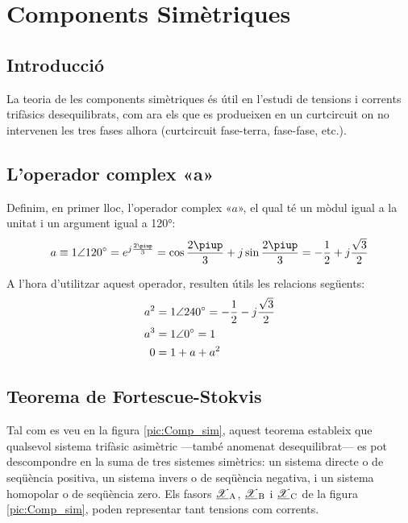 
\chapter{Components Simètriques}  \label{sec:ch-comp-sim}

\section{Introducció}
La teoria de les components simètriques és útil en l'estudi de
tensions i corrents trifàsics
 desequilibrats, com ara els que es produeixen en un curtcircuit on no intervenen les tres
 fases alhora (curtcircuit fase-terra, fase-fase, etc.).

\section{L'operador complex «a»}

Definim, en primer lloc, l'operador complex «$a$», el qual té un mòdul
igual a la unitat i un argument igual a \ang{120}: \begin{equation}
   a \equiv \complexnum{1:120} = e^{j\frac{2\piup}{3}} =
   \cos \frac{2\piup}{3} + j \sin \frac{2\piup}{3} = - \frac{1}{2} + j \frac{\sqrt{3}}{2}
\end{equation}

A l'hora d'utilitzar aquest operador, resulten útils les relacions
següents:
\begin{subequations}
\begin{align}
    a^2 &= \complexnum{1:240}= - \frac{1}{2} - j \frac{\sqrt{3}}{2} \\
    a^3 &= \complexnum{1:0} = 1 \\
    0 &= 1+ a + a^2
 \end{align}
\end{subequations}

\section{\texorpdfstring{Teorema de Fortescue-Stokvis}{Teorema de Fortescue-Stokvis}}

Tal com es veu en la figura \vref{pic:Comp_sim}, aquest teorema
estableix que qualsevol sistema trifàsic asimètric ---també anomenat
desequilibrat---  es pot descompondre  en la suma de tres sistemes
simètrics: un sistema directe o de seqüència positiva, un sistema
invers o de seqüència negativa, i un sistema homopolar o de
seqüència zero. Els fasors $\cmplx{\mathscr{X}}\ped{A}$,
$\cmplx{\mathscr{X}}\ped{B}$ i $\cmplx{\mathscr{X}}\ped{C}$ de la figura \vref{pic:Comp_sim}, poden representar tant
tensions com corrents.

